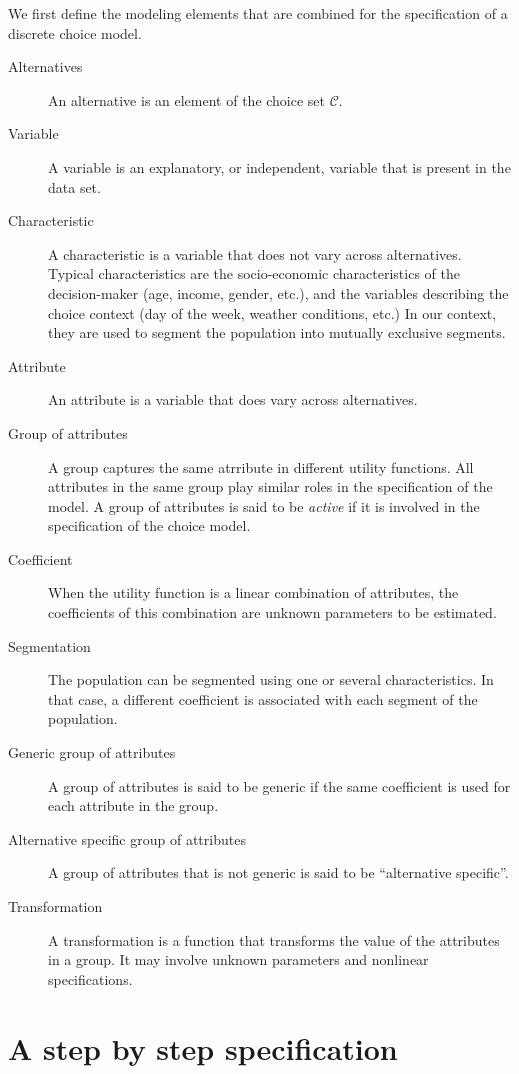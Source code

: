 \documentclass[12pt,a4paper]{article}
\newcommand{\C}{\mathcal{C}}
\begin{document}
We first define the modeling elements that are combined for the
specification of a discrete choice model.

\begin{description}
\item[Alternatives] An alternative is an element of the choice
  set $\C$.
\item[Variable] A variable is an explanatory, or independent, variable that is
  present in the data set. 
\item[Characteristic] A characteristic is a variable that does not
  vary across alternatives. Typical characteristics are the
  socio-economic characteristics of the decision-maker (age, income,
  gender, etc.), and the variables describing the choice context
  (day of the week, weather conditions, etc.) In our context, they
  are used to segment the population into mutually exclusive segments.
\item[Attribute] An attribute is a variable that does vary across
  alternatives.
\item[Group of attributes] A group captures the same atrribute in
  different utility functions. All attributes in the same group play
  similar roles in the specification of the model. A group of
  attributes is said to be \emph{active} if it is involved in the
  specification of the choice model.
\item[Coefficient] When the utility function is a linear combination
  of attributes, the coefficients of this combination are unknown
  parameters to be estimated.
\item[Segmentation] The population can be segmented using one or
  several characteristics. In that case, a different coefficient is
  associated with each segment of the population.
\item[Generic group of attributes] A group of attributes is said to
  be generic if the same coefficient is used for each attribute in
  the group.
\item[Alternative specific group of attributes] A group of  attributes that is not
  generic is said to be ``alternative specific''. 
\item[Transformation] A transformation is a function that transforms the value
  of the attributes in a group. It may involve unknown parameters and
  nonlinear specifications. 
\end{description}

\section{A step by step specification}
\end{document}
